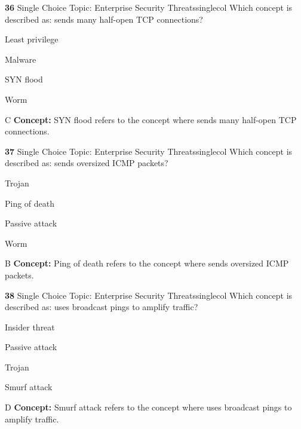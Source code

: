 \documentclass[10pt,a4paper]{article}
\begin{document}
\begin{qcard}{\color{white}\textbf{36} \hfill \small Single Choice \textbar{} Topic: Enterprise Security Threats}{singlecol}
Which concept is described as: sends many half-open TCP connections?

\begin{qoptions}
\item Least privilege
\item Malware
\item SYN flood
\item Worm
\end{qoptions}
\begin{explainbox}{C}
\textbf{Concept:} SYN flood refers to the concept where sends many half-open TCP connections.
\end{explainbox}
\end{qcard}

\begin{qcard}{\color{white}\textbf{37} \hfill \small Single Choice \textbar{} Topic: Enterprise Security Threats}{singlecol}
Which concept is described as: sends oversized ICMP packets?

\begin{qoptions}
\item Trojan
\item Ping of death
\item Passive attack
\item Worm
\end{qoptions}
\begin{explainbox}{B}
\textbf{Concept:} Ping of death refers to the concept where sends oversized ICMP packets.
\end{explainbox}
\end{qcard}

\begin{qcard}{\color{white}\textbf{38} \hfill \small Single Choice \textbar{} Topic: Enterprise Security Threats}{singlecol}
Which concept is described as: uses broadcast pings to amplify traffic?

\begin{qoptions}
\item Insider threat
\item Passive attack
\item Trojan
\item Smurf attack
\end{qoptions}
\begin{explainbox}{D}
\textbf{Concept:} Smurf attack refers to the concept where uses broadcast pings to amplify traffic.
\end{explainbox}
\end{qcard}
\end{document}
